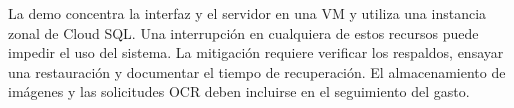 La demo concentra la interfaz y el servidor en una VM y utiliza una instancia zonal de Cloud SQL. Una interrupción en cualquiera de estos recursos puede impedir el uso del sistema. La mitigación requiere verificar los respaldos, ensayar una restauración y documentar el tiempo de recuperación. El almacenamiento de imágenes y las solicitudes OCR deben incluirse en el seguimiento del gasto.
